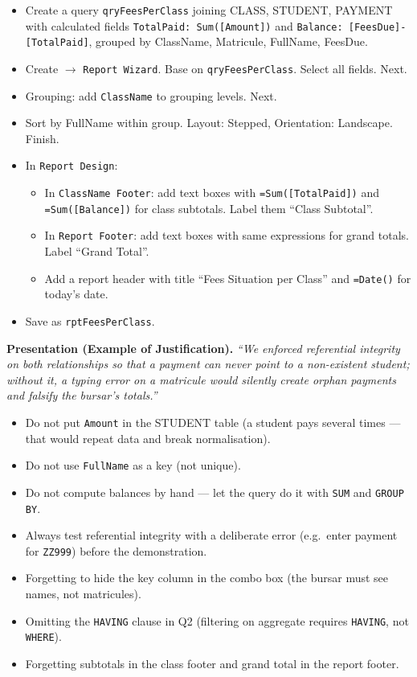 \documentclass[11pt]{article}
\newcommand{\cle}[1]{{\popxbold\color{popdark}#1}}
\begin{document}
\begin{methode}
\begin{itemize}
\item Create a query \texttt{qryFeesPerClass} joining CLASS, STUDENT, PAYMENT with calculated fields \texttt{TotalPaid: Sum([Amount])} and \texttt{Balance: [FeesDue]-[TotalPaid]}, grouped by ClassName, Matricule, FullName, FeesDue.
\item Create $\rightarrow$ \texttt{Report Wizard}. Base on \texttt{qryFeesPerClass}. Select all fields. Next.
\item Grouping: add \texttt{ClassName} to grouping levels. Next.
\item Sort by FullName within group. Layout: Stepped, Orientation: Landscape. Finish.
\item In \texttt{Report Design}: 
  \begin{itemize}
  \item In \texttt{ClassName Footer}: add text boxes with \texttt{=Sum([TotalPaid])} and \texttt{=Sum([Balance])} for class subtotals. Label them ``Class Subtotal''.
  \item In \texttt{Report Footer}: add text boxes with same expressions for grand totals. Label ``Grand Total''.
  \item Add a report header with title ``Fees Situation per Class'' and \texttt{=Date()} for today's date.
  \end{itemize}
\item Save as \texttt{rptFeesPerClass}.
\end{itemize}
\end{methode}

\textbf{Presentation (Example of Justification).} \emph{``We enforced referential integrity on both relationships so that a payment can never point to a non-existent student; without it, a typing error on a matricule would silently create orphan payments and falsify the bursar's totals.''}

\begin{attention}
\begin{itemize}
\item Do not put \texttt{Amount} in the STUDENT table (a student pays several times — that would repeat data and break \cle{normalisation}).
\item Do not use \texttt{FullName} as a key (not unique).
\item Do not compute balances by hand — let the query do it with \texttt{SUM} and \texttt{GROUP BY}.
\item Always test referential integrity with a deliberate error (e.g.\ enter payment for \texttt{ZZ999}) before the demonstration.
\item Forgetting to hide the key column in the combo box (the bursar must see names, not matricules).
\item Omitting the \texttt{HAVING} clause in Q2 (filtering on aggregate requires \texttt{HAVING}, not \texttt{WHERE}).
\item Forgetting subtotals in the class footer and grand total in the report footer.
\end{itemize}
\end{attention}
\end{document}
